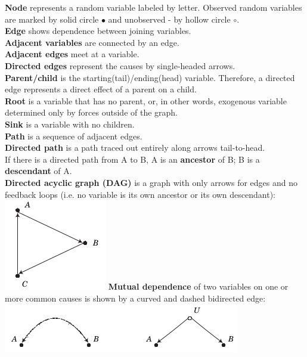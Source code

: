 \textbf{Node} represents a random variable labeled by letter. Observed random variables are marked by solid circle $\bullet$ and unobserved - by hollow circle \( \circ \). \\
\textbf{Edge} shows dependence between joining variables.\\
\textbf{Adjacent variables} are connected by an edge.\\
\textbf{Adjacent edges} meet at a variable.\\
\textbf{Directed edges} represent the causes by single-headed arrows. \\
\textbf{Parent/child} is the starting(tail)/ending(head) variable. Therefore, a directed edge represents a direct effect of a parent on a child.\\
\textbf{Root} is a variable that has no parent, or, in other words, exogenous variable determined only by forces outside of the graph.\\
\textbf{Sink} is a variable with no children.\\
\textbf{Path} is a sequence of adjacent edges.\\
\textbf{Directed path} is a path traced out entirely along arrows tail-to-head. \\
If there is a directed path from A to B,  A is an \textbf{ancestor} of B; B is a  \textbf{descendant} of A.\\
\textbf{Directed acyclic graph (DAG)} is a graph with only arrows for edges and no feedback loops (i.e. no variable is its own ancestor or its own descendant): \\
\includegraphics[trim=0 0 0 -1cm, center]{../material/graph_with_cycle.png}
\textbf{Mutual dependence} of two variables on one or more common causes is shown by a curved and dashed bidirected edge:\\
\includegraphics[trim=0 -1cm 0 -1cm, center]{../material/graph_shorthand_unobserved_common_cause.png}


